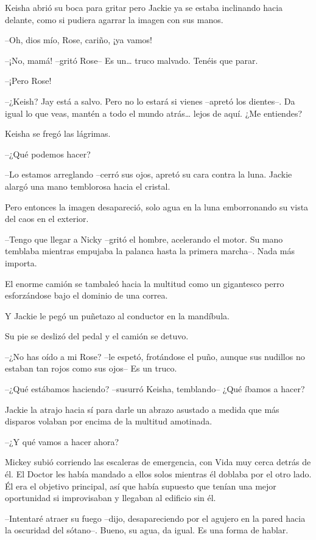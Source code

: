 {Keisha abrió su boca para gritar pero Jackie ya se estaba inclinando
hacia delante, como si pudiera agarrar la imagen con sus manos.}

{--Oh, dios mío, Rose, cariño, ¡ya vamos!}

{--¡No, mamá! --gritó Rose-- Es un\ldots{} truco malvado. Tenéis que
parar.}

{--¡Pero Rose!}

{--¿Keish? Jay está a salvo. Pero no lo estará si vienes --apretó los
 dientes--. Da igual lo que veas, mantén a todo el mundo atrás\ldots{}
lejos de aquí. ¿Me entiendes?}

{Keisha se fregó las lágrimas.}

{--¿Qué podemos hacer?}

{--Lo estamos arreglando --cerró sus ojos, apretó su cara contra la
luna. Jackie alargó una mano temblorosa hacia el cristal.}

{Pero entonces la imagen desapareció, solo agua en la luna emborronando
su vista del caos en el exterior.}

{--Tengo que llegar a Nicky --gritó el hombre, acelerando el motor. Su
 mano temblaba mientras empujaba la palanca hasta la primera marcha--.
Nada más importa.}

{El enorme camión se tambaleó hacia la multitud como un gigantesco perro
esforzándose bajo el dominio de una correa.}

{Y Jackie le pegó un puñetazo al conductor en la mandíbula.}

{Su pie se deslizó del pedal y el camión se detuvo.}

{--¿No has oído a mi Rose? --le espetó, frotándose el puño, aunque sus
nudillos no estaban tan rojos como sus ojos-- Es un truco.}

{--¿Qué estábamos haciendo? --susurró Keisha, temblando-- ¿Qué íbamos a
hacer?}

{Jackie la atrajo hacia sí para darle un abrazo asustado a medida que
más disparos volaban por encima de la multitud amotinada.}

{--¿Y qué vamos a hacer ahora?}

\mbox{}

{Mickey subió corriendo las escaleras de emergencia, con Vida muy cerca
 detrás de él. El Doctor les había mandado a ellos solos mientras él
 doblaba por el otro lado. Él era el objetivo principal, así que había
 supuesto que tenían una mejor oportunidad si improvisaban y llegaban al
edificio sin él.}

{--Intentaré atraer su fuego --dijo, desapareciendo por el agujero en la
 pared hacia la oscuridad del sótano--. Bueno, su agua, da igual. Es una
forma de hablar.}

